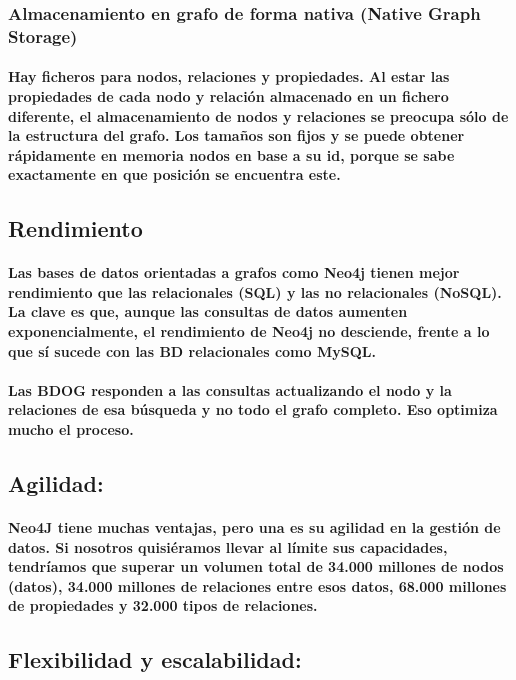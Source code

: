 \subsubsection{Almacenamiento en grafo de forma nativa (Native Graph Storage)}
 	\paragraph{Hay ficheros para nodos, relaciones y propiedades. Al estar las propiedades de cada nodo y relación almacenado en un fichero diferente, el almacenamiento de nodos y relaciones se preocupa sólo de la estructura del grafo. Los tamaños son fijos y se puede obtener rápidamente en memoria nodos en base a su id, porque se sabe exactamente en que posición se encuentra este.}
\newpage
 \subsection{Rendimiento}
	 \paragraph{Las bases de datos orientadas a grafos como Neo4j tienen mejor rendimiento que las relacionales (SQL) y las no relacionales (NoSQL). La clave es que, aunque las consultas de datos aumenten exponencialmente, el rendimiento de Neo4j no desciende, frente a lo que sí sucede con las BD relacionales como MySQL.}
 	 \paragraph{Las BDOG responden a las consultas actualizando el nodo y la relaciones de esa búsqueda y no todo el grafo completo. Eso optimiza mucho el proceso.}
\subsection{ Agilidad:}
	 \paragraph{Neo4J tiene muchas ventajas, pero una es su agilidad en la gestión de datos. Si nosotros quisiéramos llevar al límite sus capacidades, tendríamos que superar un volumen total de 34.000 millones de nodos (datos), 34.000 millones de relaciones entre esos datos, 68.000 millones de propiedades y 32.000 tipos de relaciones. }
\subsection{Flexibilidad y escalabilidad:}
